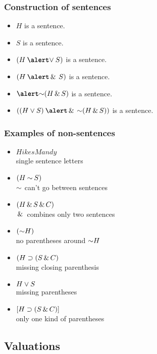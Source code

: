 \begin{frame}
  \frametitle{Construction of sentences}

  \begin{itemize}[<+->]
    \item $H$ is a sentence.
    \item $S$ is a sentence.
    \item $(H \mathbin{\emph{\eor}} S)$ is a sentence.
    \item $(H \mathbin{\emph{\eand}} S)$ is a sentence.
    \item $\emph{\enot} (H \eand S)$ is a sentence.
    \item $((H \eor S) \mathbin{\emph{\eand}} \enot (H \eand S))$ is a sentence.
  \end{itemize}


\end{frame}

\begin{frame}
  \frametitle{Examples of non-sentences}

  \begin{itemize}
    \item $\mathit{HikesMandy}$\\
    \qquad single sentence letters
    \item $(H \mathbin{\enot} S)$\\
    \qquad$\enot$ can't go between sentences
    \item $(H \,\&\, S \,\&\, C)$\\
    \qquad $\,\&\,$ combines only two sentences
    \item $(\enot H)$\\
    \qquad no parentheses around $\enot H$
    \item $(H \supset (S \,\&\, C)$\\
    \qquad missing closing parenthesis
    \item $H \vee S$\\
    \qquad missing parentheses
    \item $[H \supset (S \,\&\, C)]$\\
    \qquad only one kind of parentheses
  \end{itemize}

\end{frame}

\subsection{Valuations}

